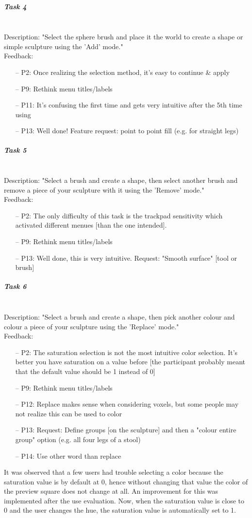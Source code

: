 \subparagraph{Task 4} \hfill \\
Description: "Select the sphere brush and place it the world to create a shape or simple sculpture using the 'Add' mode."\\
Feedback:
\begin{itemize} \setlength\itemsep{-0.5em}
	\item[--] P2: Once realizing the selection method, it's easy to continue \& apply
	\item[--] P9: Rethink menu titles/labels
	\item[--] P11: It's confusing the first time and gets very intuitive after the 5th time using
	\item[--] P13: Well done! Feature request: point to point fill (e.g. for straight legs)
\end{itemize}

\subparagraph{Task 5} \hfill \\
Description: "Select a brush and create a shape, then select another brush and remove a piece of your sculpture with it using the 'Remove' mode."\\
Feedback:
\begin{enumerate} \setlength\itemsep{-0.5em}
	\item[--] P2: The only difficulty of this task is the trackpad sensitivity which activated different menues [than the one intended].
	\item[--] P9: Rethink menu titles/labels
	\item[--] P13: Well done, this is very intuitive. Request: "Smooth surface" [tool or brush]
\end{enumerate}

\subparagraph{Task 6} \hfill \\
Description: "Select a brush and create a shape, then pick another colour and colour a piece of your sculpture using the 'Replace' mode."\\
Feedback:
\begin{enumerate} \setlength\itemsep{-0.5em}
	\item[--] P2: The saturation selection is not the most intuitive color selection. It's better you have saturation on a value before [the participant probably meant that the default value should be 1 instead of 0]
	\item[--] P9: Rethink menu titles/labels
	\item[--] P12: Replace makes sense when considering voxels, but some people may not realize this can be used to color
	\item[--] P13: Request: Define groups [on the sculpture] and then a "colour entire group" option (e.g. all four legs of a stool)
	\item[--] P14: Use other word than replace
\end{enumerate}
It was observed that a few users had trouble selecting a color because the saturation value is by default at 0, hence without changing that value the color of the preview square does not change at all. An improvement for this was implemented after the use evaluation. Now, when the saturation value is close to 0 and the user changes the hue, the saturation value is automatically set to 1.

